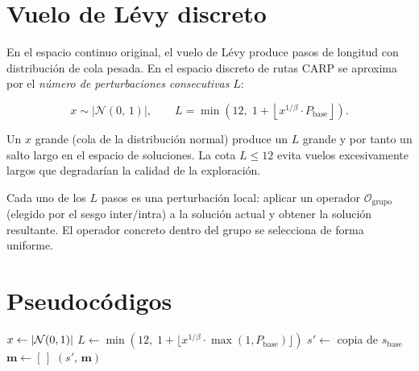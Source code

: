 \documentclass[12pt, a4paper]{article}
\begin{document}
\section{Vuelo de Lévy discreto}
\label{sec:levy}

En el espacio continuo original, el vuelo de Lévy produce pasos de longitud con
distribución de cola pesada. En el espacio discreto de rutas CARP se aproxima
por el \emph{número de perturbaciones consecutivas} $L$:

\[
x \sim |\mathcal{N}(0,\,1)|, \qquad
L = \min\!\left(12,\; 1 + \left\lfloor x^{1/\beta} \cdot P_{\mathrm{base}} \right\rfloor\right).
\]

Un $x$ grande (cola de la distribución normal) produce un $L$ grande y por tanto
un salto largo en el espacio de soluciones. La cota $L \leq 12$ evita vuelos
excesivamente largos que degradarían la calidad de la exploración.

Cada uno de los $L$ pasos es una perturbación local: aplicar un operador
$\mathcal{O}_{\mathrm{grupo}}$ (elegido por el sesgo inter/intra) a la solución
actual y obtener la solución resultante. El operador concreto dentro del grupo
se selecciona de forma uniforme.

\section{Pseudocódigos}

\begin{algorithm}[H]
\DontPrintSemicolon
\caption{VueloLévyDiscreto($s_{\mathrm{base}},\, P_{\mathrm{base}},\, \beta,\,
         \mathcal{O}_{\mathrm{grupo}}$)}
\label{alg:levy}


\BlankLine
$x \leftarrow |{\cal N}(0,1)|$
$L \leftarrow \min\!\left(12,\; 1 + \lfloor x^{1/\beta} \cdot
    \max(1, P_{\mathrm{base}}) \rfloor\right)$
$s' \leftarrow$ copia de $s_{\mathrm{base}}$ \;
$\mathbf{m} \leftarrow [\,]$ \;
\Return $(s',\, \mathbf{m})$
\end{algorithm}
\end{document}
